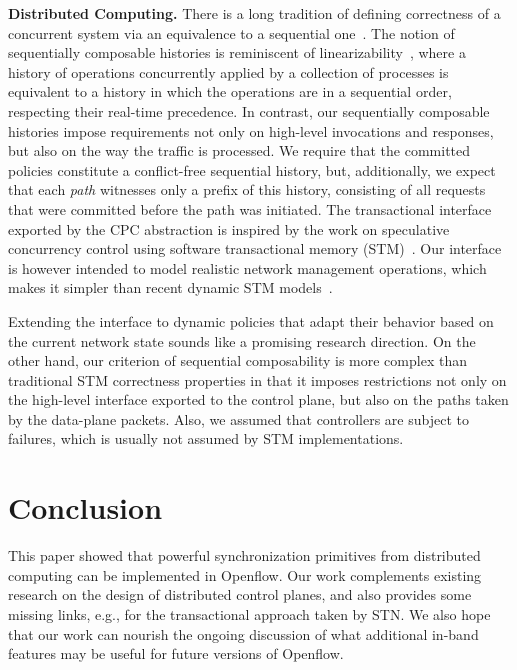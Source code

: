 \documentclass[conference]{sigcomm-alternate}
\begin{document}
\noindent\textbf{Distributed Computing.}
There is a long tradition of defining correctness of a concurrent system via
an equivalence to a sequential one~\cite{Pap79-serial,Lam79,HW90}.  The notion
of sequentially composable histories is reminiscent of
linearizability~\cite{HW90}, where a history of operations concurrently
applied by a collection of processes is equivalent to a history in which the
operations are in a sequential order, respecting their real-time precedence.
In contrast, our sequentially composable histories impose requirements not
only on high-level invocations and responses, but also on the way the traffic
is processed. We require that the committed policies constitute a
conflict-free sequential history, but, additionally,  we expect that each
\emph{path} witnesses only a prefix of this history, consisting of all
requests that were committed before the path was initiated.
%
The transactional interface exported by the CPC abstraction is inspired by the
work on speculative concurrency control using software transactional memory
(STM)~\cite{stm-st95}.
Our interface is however intended to model realistic network
management operations, which makes it simpler than recent
dynamic STM models~\cite{dstm}.

Extending the interface to dynamic policies that adapt their behavior based on
the current network state sounds like a promising research direction.  On the
other hand, our criterion of sequential composability is more complex than
traditional STM correctness properties in that it imposes restrictions not only
on the high-level interface exported to the control plane, but also on the
paths taken by the data-plane packets.
Also, we assumed that controllers are subject to failures, which is usually not
assumed by STM implementations.


\section{Conclusion}\label{sec:conclusion}

This paper showed that powerful synchronization primitives
from distributed computing can be implemented in Openflow. 
Our work complements existing research on the design of
distributed control planes, and also provides some missing links,
e.g., for the transactional approach taken by STN. 
We also hope that our work can nourish the ongoing discussion of
what additional in-band features may be useful for future
versions of Openflow.

{

}
\end{document}
